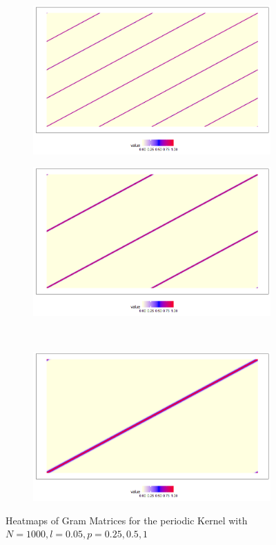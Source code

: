 \documentclass[11pt, a4paper]{article} %
\begin{document}
\normalsize
\begin{figure}[H]
\begin{subfigure}{.5\textwidth}
  \centering
  \includegraphics[width=.8\linewidth]{KSE_N1000_l005_p025.png}
  \label{fig:sfig1}
\end{subfigure}%
\begin{subfigure}{.5\textwidth}
  \centering
  \includegraphics[width=.8\linewidth]{KSE_N1000_l0005_p05.png}
  \label{fig:sfig2}
\end{subfigure}\\
\begin{subfigure}{.5\textwidth}
  \centering
  \includegraphics[width=.8\linewidth]{KSE_N1000_l005_p1.png}
  \label{fig:sfig2}
\end{subfigure}
\caption{Heatmaps of Gram Matrices for the periodic Kernel with $N = 1000, l = 0.05, p = 0.25, 0.5, 1 $}
\label{fig:fig}
\end{figure}
\end{document}
